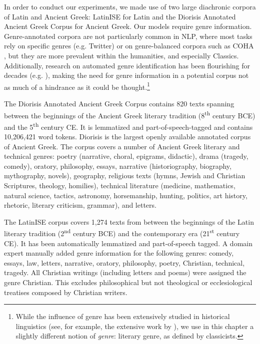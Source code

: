 \documentclass[output=paper%
]{langscibook}
\begin{document}
In order to conduct our experiments, we made use of two large diachronic corpora of Latin and Ancient Greek: LatinISE \citep{mcgillivray-kilgarriff} for Latin and the Diorisis Annotated Ancient Greek Corpus \citep{diorisis2018} for Ancient Greek. Our models require genre information.  
Genre-annotated corpora are not particularly common in NLP, where most tasks rely on specific genres (e.g. Twitter) or on genre-balanced corpora such as COHA \citep{davies2002corpus}, but they are more prevalent within the humanities, and especially Classics. 
Additionally, research on automated genre identification has been flourishing for decades (e.g. \citealt{kessler1997automatic}), making the need for genre information in a potential corpus not as much of a hindrance as it could be thought.\footnote{While the influence of genre has been extensively studied in historical linguistics (see, for example, the extensive work by \citealt{biber1989drift}), we use in this chapter a slightly different notion of \textit{genre}: literary genre, as defined by classicists.} 

The Diorisis Annotated Ancient Greek Corpus 
contains 820 texts spanning between the beginnings of the Ancient Greek literary tradition (8\textsuperscript{th} century BCE) and the 5\textsuperscript{th} century CE. It is  lemmatized and part-of-speech-tagged and contains 10,206,421 word tokens. Diorisis is the largest openly available annotated corpus of Ancient Greek. The corpus covers a number of Ancient Greek literary and technical genres: poetry (narrative, choral, epigrams, didactic), drama (tragedy, comedy), oratory, philosophy, essays, narrative (historiography, biography, mythography, novels), geography, religious texts (hymns, Jewish and Christian Scriptures, theology, homilies), technical literature (medicine, mathematics, natural science, tactics, astronomy, horsemanship, hunting, politics, art history, rhetoric, literary criticism, grammar), and letters. 


The LatinISE corpus \citep{mcgillivray-kilgarriff} covers 1,274 texts from between the beginnings of the Latin literary tradition (2\textsuperscript{nd} century BCE) and the contemporary era (21\textsuperscript{st} century CE). It has been automatically lemmatized and part-of-speech tagged. 
A domain expert manually added genre information for the following genres: comedy, essays, law, letters, narrative, oratory, philosophy, poetry, Christian, technical, tragedy. All Christian writings (including letters and poems) were assigned the genre Christian. This excludes philosophical but not theological or ecclesiological treatises composed by Christian writers. 
\end{document}
